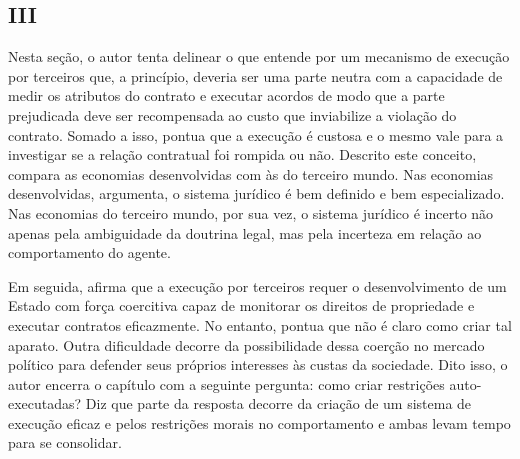 \subsection*{III}

Nesta seção, o autor tenta delinear o que entende por um mecanismo de execução por terceiros que, a princípio, deveria ser uma parte neutra com a capacidade de medir os atributos do contrato e executar acordos de modo que a parte prejudicada deve ser recompensada ao custo que inviabilize a violação do contrato. Somado a isso, pontua que a execução é custosa e o mesmo vale para a investigar se a relação contratual foi rompida ou não. Descrito este conceito, \autor compara as economias desenvolvidas com às do terceiro mundo. Nas economias desenvolvidas, argumenta, o sistema jurídico é bem definido e bem especializado. Nas economias do terceiro mundo, por sua vez, o sistema jurídico é incerto não apenas pela ambiguidade da doutrina legal, mas pela incerteza em relação ao comportamento do agente.

Em seguida, afirma que a execução por terceiros requer o desenvolvimento de um Estado com força coercitiva capaz de monitorar os direitos de propriedade e executar contratos eficazmente. No entanto, pontua que não é claro como criar tal aparato. Outra dificuldade decorre da possibilidade dessa coerção no mercado político para defender seus próprios interesses às custas da sociedade. Dito isso, o autor encerra o capítulo com a seguinte pergunta: como criar restrições auto-executadas? Diz que parte da resposta decorre da criação de um sistema de execução eficaz e pelos restrições morais no comportamento e ambas levam tempo para se consolidar.